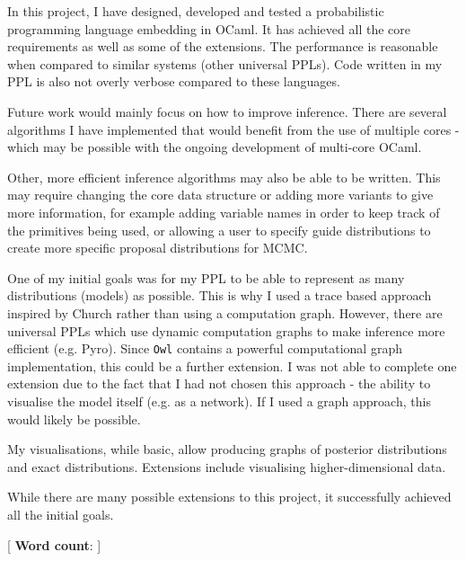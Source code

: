 
In this project, I have designed, developed and tested a probabilistic programming language embedding in OCaml. It has achieved all the core requirements as well as some of the extensions. The performance is reasonable when compared to similar systems (other universal PPLs). Code written in my PPL is also not overly verbose compared to these languages.

Future work would mainly focus on how to improve inference. There are several algorithms I have implemented that would benefit from the use of multiple cores - which may be possible with the ongoing development of multi-core OCaml. 

Other, more efficient inference algorithms may also be able to be written. This may require changing the core data structure or adding more variants to give more information, for example adding variable names in order to keep track of the primitives being used, or allowing a user to specify guide distributions to create more specific proposal distributions for MCMC.

One of my initial goals was for my PPL to be able to represent as many distributions (models) as possible. This is why I used a trace based approach inspired by Church rather than using a computation graph. However, there are universal PPLs which use dynamic computation graphs to make inference more efficient (e.g. Pyro). Since \texttt{Owl} contains a powerful computational graph implementation, this could be a further extension. I was not able to complete one extension due to the fact that I had not chosen this approach - the ability to visualise the model itself (e.g. as a network). If I used a graph approach, this would likely be possible.

My visualisations, while basic, allow producing graphs of posterior distributions and exact distributions. Extensions include visualising higher-dimensional data.

While there are many possible extensions to this project, it successfully achieved all the initial goals.

\mbox{}
\vfill
[ {\small \textbf{Word count}: }]